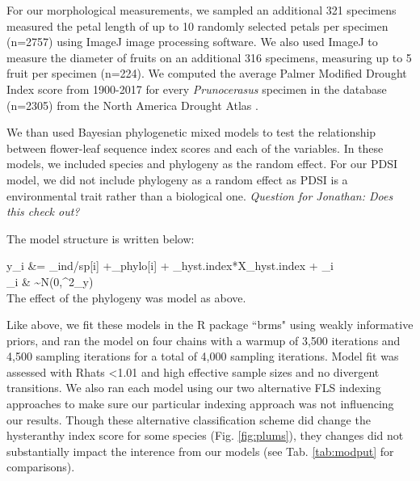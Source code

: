 \documentclass{article}[11pt]
\begin{document}
\noindent For our morphological measurements, we sampled an additional 321 specimens measured the petal length of up to 10 randomly selected petals per specimen (n=2757) using ImageJ image processing software. We also used ImageJ to measure the diameter of fruits on an additional 316 specimens, measuring up to 5 fruit per specimen (n=224).
We computed the average Palmer Modified Drought Index score from 1900-2017 for every \textit{Prunocerasus} specimen in the database (n=2305) from the North America Drought Atlas \citep{Cook2004}.

We than used Bayesian phylogenetic mixed models to test the relationship between flower-leaf sequence index scores and each of the variables. In these models, we included species and phylogeny as the random effect. For our PDSI model, we did not include phylogeny as a random effect as PDSI is a environmental trait rather than a biological one. \textit{Question for Jonathan: Does this check out?}

The model structure is written below: 

  y_i &= \alpha_{ind/sp[i]} +\alpha_{phylo[i]} + \beta_{hyst.index}*X_{hyst.index} + \epsilon_i\\
  
  \epsilon_i & \sim N(0,\sigma^2_y) \\ %
  
  \noindent The effect of the phylogeny was model as above.%
  
Like above, we fit these models in the R package ``brms" \citep{Burkner2018} using weakly informative priors, and ran the model on four chains with a warmup of 3,500 iterations and 4,500 sampling iterations for a total of 4,000 sampling iterations. Model fit was assessed with Rhats <1.01 and high effective sample sizes and no divergent transitions. We also ran each model using our two alternative FLS indexing approaches to make sure our particular indexing approach was not influencing our results. Though these alternative classification scheme did change the hysteranthy index score for some species (Fig. \ref{fig:plums}), they changes did not substantially impact the interence from our models (see Tab. \ref{tab:modput} for comparisons).
\end{document}
